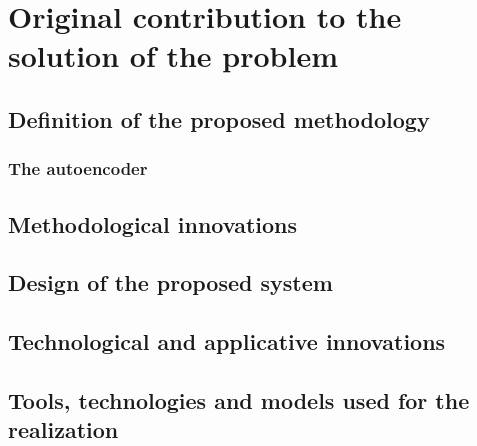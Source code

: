 \chapter{Original contribution to the solution of the problem}
\section{Definition of the proposed methodology}
\subsection{The autoencoder}
\section {Methodological innovations}
\section{Design of the proposed system}
\section{Technological and applicative innovations}
\section{Tools, technologies and models used for the realization}
